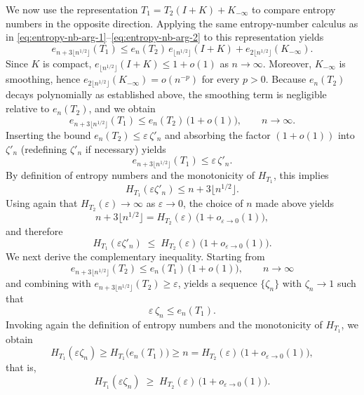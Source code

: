 \documentclass[a4paper,12pt]{article}
\begin{document}

We now use the representation $T_1=T_2(I+K)+K_{-\infty}$ to compare entropy numbers in the
opposite direction.
Applying the same entropy-number calculus as in
\eqref{eq:entropy-nb-arg-1}--\eqref{eq:entropy-nb-arg-2}
to this representation yields
\[
e_{n+3\lfloor n^{1/2}\rfloor}(T_1)
\le e_n(T_2)\,e_{\lfloor n^{1/2}\rfloor}(I+K)
+ e_{2\lfloor n^{1/2}\rfloor}(K_{-\infty}).
\]
Since $K$ is compact, $e_{\lfloor n^{1/2}\rfloor}(I+K)\le 1+o(1)$ as $n\to\infty$.
Moreover, $K_{-\infty}$ is smoothing, hence
$e_{2\lfloor n^{1/2}\rfloor}(K_{-\infty})=o(n^{-p})$ for every $p>0$.
Because $e_n(T_2)$ decays polynomially as established above, the smoothing term is negligible relative to
$e_n(T_2)$, and we obtain
\[
e_{n+3\lfloor n^{1/2}\rfloor}(T_1)\le e_n(T_2)\,\bigl(1+o(1)\bigr),
\qquad n\to\infty.
\]
Inserting the bound $e_n(T_2)\le \varepsilon\,\zeta'_n$ and absorbing the factor
$(1+o(1))$ into $\zeta'_n$ (redefining $\zeta'_n$ if necessary) yields
\[
e_{n+3\lfloor n^{1/2}\rfloor}(T_1)\le \varepsilon\,\zeta'_n.
\]
By definition of entropy numbers and the monotonicity of $H_{T_1}$, this implies
\[
H_{T_1}(\varepsilon\zeta'_n)\le n+3\lfloor n^{1/2}\rfloor.
\]
Using again that $H_{T_2}(\varepsilon)\to\infty$ as $\varepsilon\to0$, the choice of $n$ made above yields
\[
n+3\lfloor n^{1/2}\rfloor
= H_{T_2}(\varepsilon)\,\bigl(1+o_{\varepsilon\to0}(1)\bigr),
\]
and therefore
\begin{equation}\label{eq:upper-bound-H}
H_{T_1}(\varepsilon\zeta'_n)
\;\le\;
H_{T_2}(\varepsilon)\,\bigl(1+o_{\varepsilon\to0}(1)\bigr).
\end{equation}
We next derive the complementary inequality.
Starting from 
\[
e_{n+3\lfloor n^{1/2}\rfloor}(T_2)
\le e_n(T_1)\,\bigl(1+o(1)\bigr),
\qquad n\to\infty
\]
and combining with $e_{n+3\lfloor n^{1/2}\rfloor}(T_2)\ge\varepsilon$, yields a
sequence $\{\zeta_n\}$ with $\zeta_n\to1$ such that
\[
\varepsilon\,\zeta_n \le e_n(T_1).
\]
Invoking again the definition of entropy numbers and the monotonicity of $H_{T_1}$, we
obtain
\[
H_{T_1}(\varepsilon\zeta_n)\ge H_{T_1}\bigl(e_n(T_1)\bigr)\ge n
= H_{T_2}(\varepsilon)\,\bigl(1+o_{\varepsilon\to0}(1)\bigr),
\]
that is,
\begin{equation}\label{eq:lower-bound-H}
H_{T_1}(\varepsilon\zeta_n)
\;\ge\;
H_{T_2}(\varepsilon)\,\bigl(1+o_{\varepsilon\to0}(1)\bigr).
\end{equation}
\end{document}
